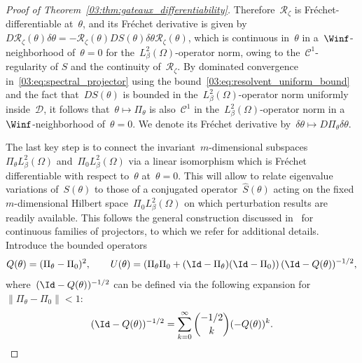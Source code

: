 \begin{proof}[Proof of Theorem~\ref{03:thm:gateaux_differentiability}]
    Therefore~$\mathcal R_\zeta$ is Fréchet-differentiable at~$\theta$, and its Fréchet derivative is given by~$D \mathcal R_\zeta(\theta)\delta\theta = -\mathcal R_\zeta(\theta)DS(\theta)\delta\theta\mathcal R_\zeta(\theta)$, which is continuous in~$\theta$ in a~$\Winf$-neighborhood of~$\theta=0$ for the~$L^2_\beta(\Omega)$-operator norm, owing to the~$\mathcal C^1$-regularity of $S$ and the continuity of~$\mathcal R_\zeta$.
    By dominated convergence in~\eqref{03:eq:spectral_projector} using the bound~\eqref{03:eq:resolvent_uniform_bound} and the fact that~$D S(\theta)$ is bounded in the~$L^2_\beta(\Omega)$-operator norm uniformly inside~$\mathcal D$, it follows that~$\theta\mapsto \Pi_\theta$ is also~$\mathcal C^1$ in the~$L^2_\beta(\Omega)$-operator norm in a~$\Winf$-neighborhood of~$\theta=0$. We denote its Fréchet derivative by~$\delta\theta\mapsto D \Pi_\theta\delta\theta$.

    The last key step is to connect the invariant~$m$-dimensional subspaces~${\Pi_\theta L^2_\beta(\Omega)}$ and~${\Pi_0 L^2_\beta(\Omega)}$ via a linear isomorphism which is Fréchet differentiable with respect to~$\theta$ at~$\theta=0$.
    This will allow to relate eigenvalue variations of~$S(\theta)$ to those of a conjugated operator~$\widehat S(\theta)$ acting on the fixed $m$-dimensional Hilbert space~${\Pi_0 L^2_\beta(\Omega)}$ on which perturbation results are readily available.
    This follows the general construction discussed in~\cite[Section I.4.6]{K95} for continuous families of projectors, to which we refer for additional details.
    Introduce the bounded operators
    \begin{equation}
        Q(\theta) = (\Pi_\theta-\Pi_0)^2,\qquad U(\theta) = \left(\Pi_\theta\Pi_0+(\Id-\Pi_\theta)(\Id-\Pi_0)\right)(\Id-Q(\theta))^{-1/2},
    \end{equation}
    where~$(\Id-Q(\theta))^{-1/2}$ can be defined via the following expansion for~$\|\Pi_\theta-\Pi_0\|<1$:
    $$(\Id-Q(\theta))^{-1/2} = \sum_{k=0}^\infty {{-1/2}\choose{k}} (-Q(\theta))^k.$$


\end{proof}
